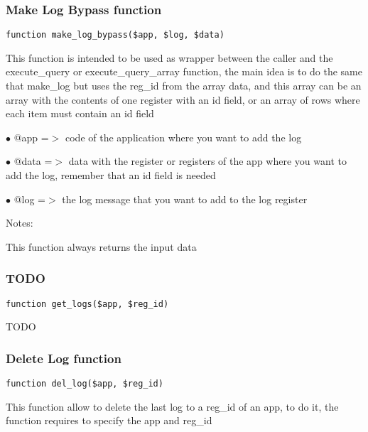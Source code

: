 \documentclass[a4paper]{article}
\begin{document}
\hypertarget{toc490}{}
\subsubsection{Make Log Bypass function}

\begin{lstlisting}
function make_log_bypass($app, $log, $data)
\end{lstlisting}

This function is intended to be used as wrapper between the caller and the
execute\_query or execute\_query\_array function, the main idea is to do the
same that make\_log but uses the reg\_id from the array data, and this array
can be an array with the contents of one register with an id field, or an
array of rows where each item must contain an id field

\begin{compactitem}
\item[\color{myblue}$\bullet$] @app  =$>$ code of the application where you want to add the log
\item[\color{myblue}$\bullet$] @data =$>$ data with the register or registers of the app where you want to
         add the log, remember that an id field is needed
\item[\color{myblue}$\bullet$] @log  =$>$ the log message that you want to add to the log register
\end{compactitem}

Notes:

This function always returns the input data

\hypertarget{toc491}{}
\subsubsection{TODO}

\begin{lstlisting}
function get_logs($app, $reg_id)
\end{lstlisting}

TODO

\hypertarget{toc492}{}
\subsubsection{Delete Log function}

\begin{lstlisting}
function del_log($app, $reg_id)
\end{lstlisting}

This function allow to delete the last log to a reg\_id of an app, to do it,
the function requires to specify the app and reg\_id
\end{document}

